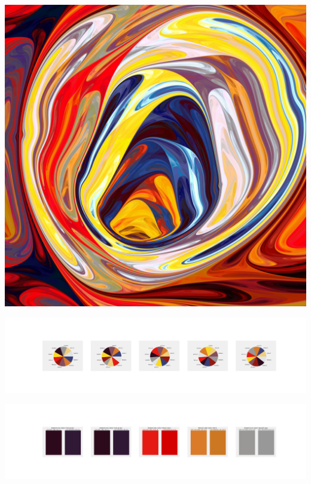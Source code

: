 \documentclass[11pt]{article}
\begin{document}
\begin{landscape}
    \begin{center}
    \includegraphics[width=\textwidth]{./nbimg/file (271).jpg}
    \end{center}

    \begin{center}
    \includegraphics[width=250mm]{./nbimg/pie-191.jpg}
    \end{center}

    \begin{center}
    \includegraphics[width=250mm]{./nbimg/peak-191.jpg}
    \end{center}
    


\end{landscape}
\end{document}
